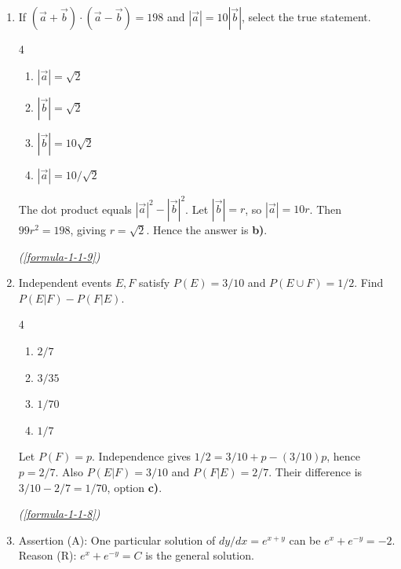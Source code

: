 \begin{enumerate}[label={},font=\normalfont,leftmargin=1.15cm,labelwidth=1.0cm,labelsep=0.15cm,itemindent=0pt,listparindent=0pt,itemsep=\baselineskip,parsep=0pt,topsep=0pt]
\item[3.1.15] If $(\vec a+\vec b)\cdot(\vec a-\vec b)=198$ and $|\vec a|=10|\vec b|$, select the true statement.

\begin{multicols}{4}
\begin{enumerate}
\setlength{\itemsep}{0pt}
    \item $|\vec a|=\sqrt2$
    \item $|\vec b|=\sqrt2$
    \item $|\vec b|=10\sqrt2$
    \item $|\vec a|=10/\sqrt2$
\end{enumerate}
\end{multicols}

\vspace{0.6em}\par\solution


The dot product equals $|\vec a|^2-|\vec b|^2$. Let $|\vec b|=r$, so $|\vec a|=10r$. Then $99r^2=198$, giving $r=\sqrt2$. Hence the answer is \textbf{b)}.\par\noindent\hfill\mbox{\textit{(\ref{formula-1-1-9})}}\par

\item[3.1.18] Independent events $E,F$ satisfy $P(E)=3/10$ and $P(E\cup F)=1/2$. Find $P(E|F)-P(F|E)$.

\begin{multicols}{4}
\begin{enumerate}
\setlength{\itemsep}{0pt}
    \item $2/7$
    \item $3/35$
    \item $1/70$
    \item $1/7$
\end{enumerate}
\end{multicols}

\vspace{0.6em}\par\solution


Let $P(F)=p$. Independence gives $1/2=3/10+p-(3/10)p$, hence $p=2/7$. Also $P(E|F)=3/10$ and $P(F|E)=2/7$. Their difference is $3/10-2/7=\boxed{1/70}$, option \textbf{c)}.\par\noindent\hfill\mbox{\textit{(\ref{formula-1-1-8})}}\par

\newpage
\item[3.1.19] Assertion (A): One particular solution of $dy/dx=e^{x+y}$ can be $e^x+e^{-y}=-2$. Reason (R): $e^x+e^{-y}=C$ is the general solution.


\end{enumerate}
